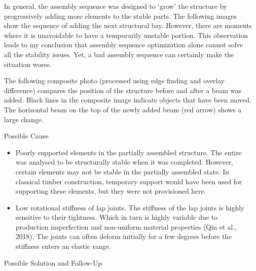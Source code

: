 In general, the assembly sequence was designed to ‘grow’ the structure by progressively adding more elements to the stable parts. The following images show the sequence of adding the next structural bay. However, there are moments where it is unavoidable to have a temporarily unstable portion. This observation leads to my conclusion that assembly sequence optimization alone cannot solve all the stability issues. Yet, a bad assembly sequence can certainly make the situation worse.

The following composite photo (processed using edge finding and overlay difference) compares the position of the structure before and after a beam was added. Black lines in the composite image indicate objects that have been moved. The horizontal beam on the top of the newly added beam (red arrow) shows a large change.

Possible Cause
\begin{itemize}
\item Poorly supported elements in the partially assembled structure. The entire was analysed to be structurally stable when it was completed. However, certain elements may not be stable in the partially assembled state. In classical timber construction, temporary support would have been used for supporting these elements, but they were not provisioned here.
\item Low rotational stiffness of lap joints. The stiffness of the lap joints is highly sensitive to their tightness. Which in turn is highly variable due to production imperfection and non-uniform material properties (Qin et al., 2018). The joints can often deform initially for a few degrees before the stiffness enters an elastic range.
\end{itemize}

Possible Solution and Follow-Up

